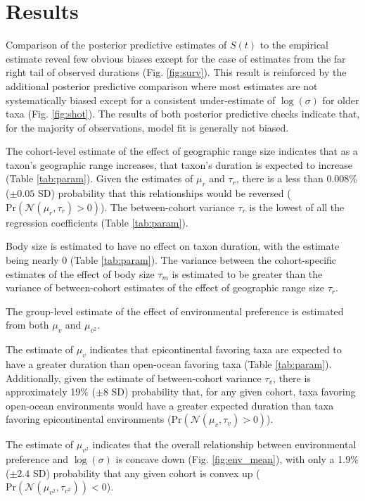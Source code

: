 \documentclass{article}
\begin{document}
\section{Results}

Comparison of the posterior predictive estimates of \(S(t)\) to the empirical estimate reveal few obvious biases except for the case of estimates from the far right tail of observed durations (Fig. \ref{fig:surv}). This result is reinforced by the additional posterior predictive comparison where most estimates are not systematically biased except for a consistent under-estimate of \(\log(\sigma)\) for older taxa (Fig. \ref{fig:shot}). The results of both posterior predictive checks indicate that, for the majority of observations, model fit is generally not biased.

The cohort-level estimate of the effect of geographic range size indicates that as a taxon's geographic range increases, that taxon's duration is expected to increase (Table \ref{tab:param}). Given the estimates of \(\mu_{r}\) and \(\tau_{r}\), there is a less than 0.008\% (\(\pm 0.05\) SD) probability that this relationships would be reversed (\(\mathrm{Pr}\left(\mathcal{N}(\mu_{r}, \tau_{r}) > 0\right)\)). The between-cohort variance \(\tau_{r}\) is the lowest of all the regression coefficients (Table \ref{tab:param}).

Body size is estimated to have no effect on taxon duration, with the estimate being nearly 0 (Table \ref{tab:param}). The variance between the cohort-specific estimates of the effect of body size \(\tau_{m}\) is estimated to be greater than the variance of between-cohort estimates of the effect of geographic range size \(\tau_{r}\). 

The group-level estimate of the effect of environmental preference is estimated from both \(\mu_{v}\) and \(\mu_{v^{2}}\). 

The estimate of \(\mu_{v}\) indicates that epicontinental favoring taxa are expected to have a greater duration than open-ocean favoring taxa (Table \ref{tab:param}). Additionally, given the estimate of between-cohort variance \(\tau_{v}\), there is approximately 19\% (\(\pm 8\) SD) probability that, for any given cohort, taxa favoring open-ocean environments would have a greater expected duration than taxa favoring epicontinental environments (\(\mathrm{Pr}\left(\mathcal{N}(\mu_{v}, \tau_{v}) > 0 \right)\)). 

The estimate of \(\mu_{v^{2}}\) indicates that the overall relationship between environmental preference and \(\log(\sigma)\) is concave down (Fig. \ref{fig:env_mean}), with only a 1.9\% (\(\pm 2.4\) SD) probability that any given cohort is convex up (\(\mathrm{Pr}\left(\mathcal{N}(\mu_{v^{2}}, \tau_{v^{2}})\right) < 0\)).
\end{document}
